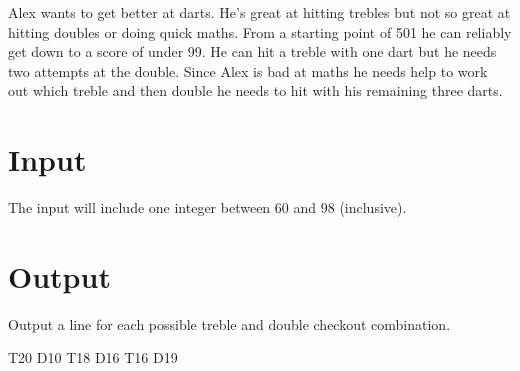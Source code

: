 
Alex wants to get better at darts. He's great at hitting trebles but not so great at hitting doubles or doing quick maths. 
From a starting point of 501 he can reliably get down to a score of under 99. He can hit a treble with one dart but he needs two attempts at the double. 
Since Alex is bad at maths he needs help to work out which treble and then double he needs to hit with his remaining three darts.

\section*{Input}

The input will include one integer between $60$ and $98$ (inclusive).

\section*{Output}

Output a line for each possible treble and double checkout combination.

T20 D10
T18 D16
T16 D19